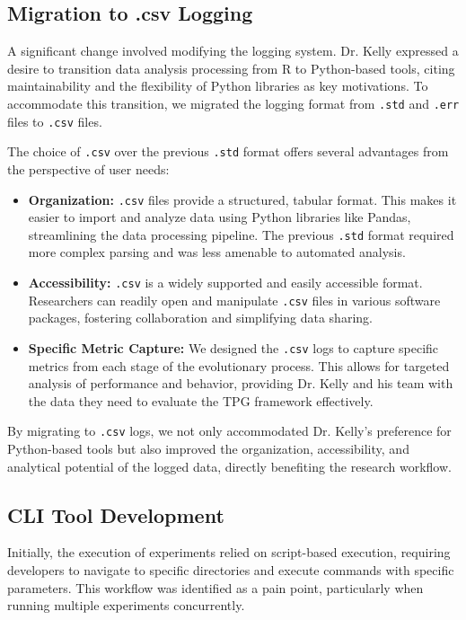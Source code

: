 \documentclass{article}
\begin{document}
\subsection{Migration to .csv Logging}

A significant change involved modifying the logging system. Dr. Kelly expressed a desire to transition data analysis processing from R to Python-based tools, citing maintainability and the flexibility of Python libraries as key motivations. To accommodate this transition, we migrated the logging format from \texttt{.std} and \texttt{.err} files to \texttt{.csv} files.

The choice of \texttt{.csv} over the previous \texttt{.std} format offers several advantages from the perspective of user needs:

\begin{itemize}
    \item \textbf{Organization:} \texttt{.csv} files provide a structured, tabular format. This makes it easier to import and analyze data using Python libraries like Pandas, streamlining the data processing pipeline. The previous \texttt{.std} format required more complex parsing and was less amenable to automated analysis.
    \item \textbf{Accessibility:} \texttt{.csv} is a widely supported and easily accessible format. Researchers can readily open and manipulate \texttt{.csv} files in various software packages, fostering collaboration and simplifying data sharing.
    \item \textbf{Specific Metric Capture:} We designed the \texttt{.csv} logs to capture specific metrics from each stage of the evolutionary process. This allows for targeted analysis of performance and behavior, providing Dr. Kelly and his team with the data they need to evaluate the TPG framework effectively.
\end{itemize}

By migrating to \texttt{.csv} logs, we not only accommodated Dr. Kelly's preference for Python-based tools but also improved the organization, accessibility, and analytical potential of the logged data, directly benefiting the research workflow.

\subsection{CLI Tool Development}

Initially, the execution of experiments relied on script-based execution, requiring developers to navigate to specific directories and execute commands with specific parameters. This workflow was identified as a pain point, particularly when running multiple experiments concurrently.
\end{document}
